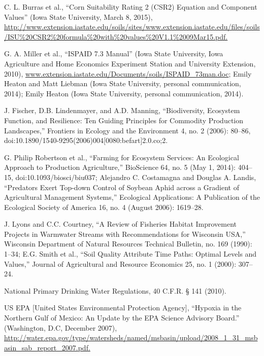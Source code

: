 \documentclass[11pt]{article}
\begin{document}
\begin{thebibliography}{1}
  C. L. Burras et al., “Corn Suitability Rating 2 (CSR2) Equation and Component Values” (Iowa State University, March 8, 2015), \url{http://www.extension.iastate.edu/soils/sites/www.extension.iastate.edu/files/soils/ISU\%20CSR2\%20formula\%20with\%20values\%20V1.1\%2009Mar15.pdf.}
  
    G. A. Miller et al., “ISPAID 7.3 Manual” (Iowa State University, Iowa Agriculture and Home Economics Experiment Station and University Extension, 2010), \url{www.extension.iastate.edu/Documents/soils/ISPAID_73man.doc}; Emily Heaton and Matt Liebman (Iowa State University, personal communication, 2014); Emily Heaton (Iowa State University, personal communication, 2014).
   
   J. Fischer, D.B. Lindenmayer, and A.D. Manning, “Biodiversity, Ecosystem Function, and Resilience: Ten Guiding Principles for Commodity Production Landscapes,” Frontiers in Ecology and the Environment 4, no. 2 (2006): 80–86, doi:10.1890/1540-9295(2006)004[0080:befart]2.0.co;2.
   
   G. Philip Robertson et al., “Farming for Ecosystem Services: An Ecological Approach to Production Agriculture,” BioScience 64, no. 5 (May 1, 2014): 404–15, doi:10.1093/biosci/biu037; Alejandro C. Costamagna and Douglas A. Landis, “Predators Exert Top-down Control of Soybean Aphid across a Gradient of Agricultural Management Systems,” Ecological Applications: A Publication of the Ecological Society of America 16, no. 4 (August 2006): 1619–28.
   
   J. Lyons and C.C. Courtney, “A Review of Fisheries Habitat Improvement Projects in Warmwater Streams with Recommendations for Wisconsin USA,” Wisconsin Department of Natural Resources Technical Bulletin, no. 169 (1990): 1–34; E.G. Smith et al., “Soil Quality Attribute Time Paths: Optimal Levels and Values,” Journal of Agricultural and Resource Economics 25, no. 1 (2000): 307–24.
   
   National Primary Drinking Water Regulations, 40 C.F.R. § 141 (2010).
   
   US EPA [United States Environmental Protection Agency], “Hypoxia in the Northern Gulf of Mexico: An Update by the EPA Science Advisory Board.” (Washington, D.C, December 2007), \url{http://water.epa.gov/type/watersheds/named/msbasin/upload/2008_1_31_msbasin_sab_report_2007.pdf.}
   

\end{thebibliography}
\end{document}

